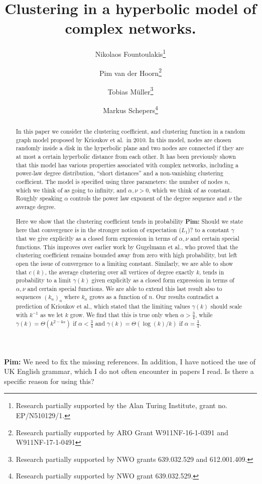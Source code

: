 \documentclass[a4paper,10pt]{article}
\title{Clustering in a hyperbolic model of complex networks.}
\author[1]{Nikolaos Fountoulakis\thanks{Research partially supported by the Alan Turing Institute, grant no. EP/N510129/1.}}
\author[2]{Pim van der Hoorn\thanks{Research partially supported by ARO Grant W911NF-16-1-0391 and W911NF-17-1-0491}}
\author[3]{Tobias M\"{u}ller\thanks{Research partially supported by NWO grants 639.032.529 and 612.001.409.}}
\author[3]{Markus Schepers\thanks{Research partially supported by NWO grant 639.032.529.}}
\affil[1]{ School of Mathematics, University of Birmingham, United Kingdom.}
\affil[2]{Department of Physics, Northeastern University, United States.}
\affil[3]{Bernoulli Institute, University of Groningen, The Netherlands.}
\newcommand{\1}{\mathds{1}}								%
\newcommand{\OR}[1]{{{\color{orange} #1}}}
\newcommand{\PvdH}[1]{{\OR{{\bf Pim:} #1}}}
\begin{document}
\maketitle

\begin{abstract}
In this paper we consider the clustering coefficient, and clustering function in a random graph model proposed by Krioukov et al.~in 2010. In this model, nodes are chosen randomly inside a disk in the hyperbolic plane and two nodes are connected if they are at most a certain hyperbolic distance from each other. It has been previously shown that this model has various properties associated with complex networks, including a power-law degree distribution, ``short distances'' and a non-vanishing clustering coefficient. The model is specified using three parameters: the number of nodes $n$, which we think of as going to infinity, and $\alpha, \nu > 0$, which we think of as constant. Roughly speaking $\alpha$ controls the power law exponent of the degree sequence and $\nu$ the average degree.

Here we show that the clustering coefficient tends in probability \PvdH{Should we state here that convergence is in the stronger notion of expectation ($L_1$)?} to a constant $\gamma$ that we give explicitly as a closed form expression in terms of $\alpha, \nu$ and certain special functions. This improves over earlier work by Gugelmann et al., who proved that the clustering coefficient remains bounded away from zero with high probability, but left open the issue of convergence to a limiting constant. Similarly, we are able to show that $c(k)$, the average clustering over all vertices of degree exactly $k$, tends in probability to a limit $\gamma(k)$ given explicitly as a closed form expression in terms of $\alpha, \nu$ and certain special functions. We are able to extend this last result also to sequences $(k_n)_n$ where $k_n$ grows as a function of $n$. Our results contradict a prediction of Krioukov et al., which stated that the limiting values $\gamma(k)$ should scale with $k^{-1}$ as we let $k$ grow. We find that this is true only when $\alpha > \frac34$, while $\gamma(k) = \Theta( k^{2 - 4\alpha})$ if $\alpha < \frac34$ and $\gamma(k) = \Theta( \log(k) / k )$ if $\alpha=\frac34$.
\end{abstract}

\newpage

\tableofcontents

\newpage

\PvdH{We need to fix the missing references. In addition, I have noticed the use of UK English grammar, which I do not often encounter in papers I read. Is there a specific reason for using this?}
\end{document}
